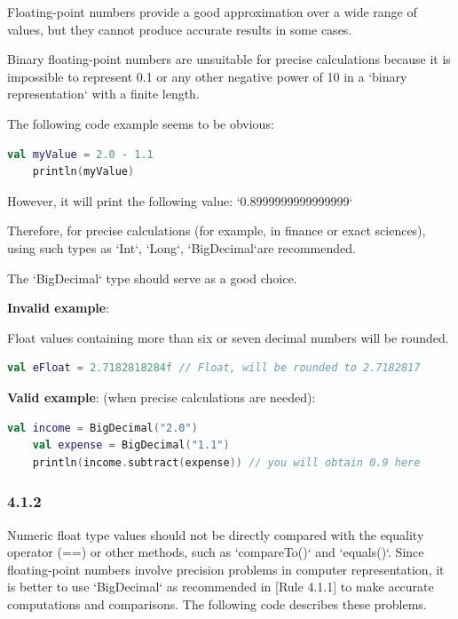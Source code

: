 {{{{Floating-point numbers provide a good approximation over a wide range of values, but they cannot produce accurate results in some cases.

Binary floating-point numbers are unsuitable for precise calculations because it is impossible to represent 0.1 or any other negative power of 10 in a `binary representation` with a finite length.



The following code example seems to be obvious: 

\begin{lstlisting}[language=Kotlin]
    val myValue = 2.0 - 1.1
    println(myValue)
\end{lstlisting}


However, it will print the following value: `0.8999999999999999`



Therefore, for precise calculations (for example, in finance or exact sciences), using such types as `Int`, `Long`, `BigDecimal`are recommended.

The `BigDecimal` type should serve as a good choice.



\textbf{Invalid example}:

Float values containing more than six or seven decimal numbers will be rounded.

\begin{lstlisting}[language=Kotlin]
 val eFloat = 2.7182818284f // Float, will be rounded to 2.7182817
\end{lstlisting}


\textbf{Valid example}: (when precise calculations are needed): 

\begin{lstlisting}[language=Kotlin]
    val income = BigDecimal("2.0")
    val expense = BigDecimal("1.1")
    println(income.subtract(expense)) // you will obtain 0.9 here
\end{lstlisting}


\subsubsection*{\textbf{4.1.2}}
\leavevmode\newline

Numeric float type values should not be directly compared with the equality operator (==) or other methods, such as `compareTo()` and `equals()`. Since floating-point numbers involve precision problems in computer representation, it is better to use `BigDecimal` as recommended in [Rule 4.1.1] to make accurate computations and comparisons. The following code describes these problems.



}}}}
